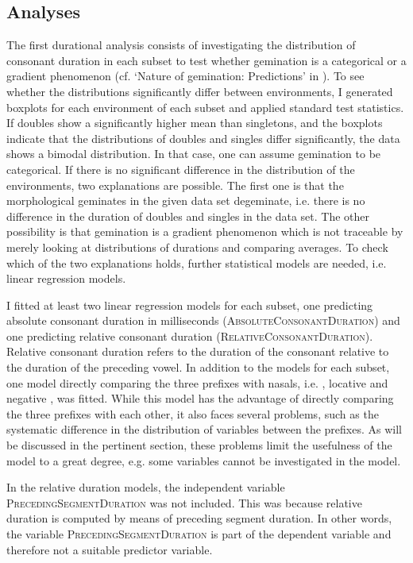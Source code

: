 \subsection{Analyses} \label{analyses dur corpus}


The first durational analysis consists of investigating the distribution of consonant duration in each subset to test whether gemination is a categorical or a gradient phenomenon (cf. `Nature of gemination: Predictions' in ). To see whether the distributions significantly differ between environments, I generated boxplots for each environment of each subset and applied standard test statistics. 
If doubles show a significantly higher mean than singletons, and the boxplots indicate that the distributions of doubles and singles differ significantly, the data shows a bimodal distribution. In that case, one can assume gemination to be categorical. 
If there is no significant difference in the distribution of the environments, two explanations are possible. The first one is that the morphological geminates in the given data set degeminate, i.e. there is no difference in the duration of doubles and singles in the data set. The other possibility is that gemination is a gradient phenomenon which is not traceable by merely looking at distributions of durations and comparing averages. To check which of the two explanations holds, further statistical models are needed, i.e. linear regression models. 



I fitted at least two linear regression models for each subset, one predicting absolute consonant duration in milliseconds  (\textsc{AbsoluteConsonantDuration}) and one predicting relative consonant duration (\textsc{RelativeConsonantDuration}). Relative consonant duration refers to the duration of the consonant relative to the duration of the preceding vowel. In addition to the models for each subset, one model directly comparing the three prefixes with nasals, i.e. , locative  and negative , was fitted. While this model has the advantage of directly comparing the three prefixes with each other, it also faces several problems, such as the systematic difference in the distribution of variables between the prefixes. As will be discussed in the pertinent section, these problems limit the usefulness of the model to a great degree, e.g. some variables cannot be investigated in the model.

In the relative duration models, the independent variable \textsc{PrecedingSegmentDuration} was not included. This was because relative duration is computed by means of preceding segment duration. In other words, the variable \textsc{PrecedingSegmentDuration} is part of the dependent variable and therefore not a suitable predictor variable.


